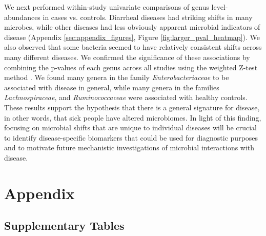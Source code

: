 \documentclass[12pt]{article}
\begin{document}
We next performed within-study univariate comparisons of genus level-abundances in cases vs. controls. Diarrheal 
diseases had striking shifts in many microbes, while other
diseases had less obviously apparent microbial indicators of disease (Appendix \ref{sec:appendix_figures}, Figure \ref{fig:larger_pval_heatmap}). We also observed that some bacteria
seemed to have relatively consistent shifts across many
different diseases. We confirmed the significance of these associations by combining the p-values of each genus across all studies using the weighted Z-test method \cite{zavkin-ztest-2011}.
We found many genera in the family \textit{Enterobacteriaceae} to be associated
with disease in general, while many genera in the families \textit{Lachnospiraceae}, 
and \textit{Ruminococcaceae} were associated with healthy controls.
These results support the hypothesis that
there is a general signature for disease, in other words, that sick people have 
altered microbiomes. In light of this finding, focusing on microbial shifts that 
are unique to individual diseases will be crucial to identify disease-specific biomarkers
that could be used for diagnostic purposes and to motivate future mechanistic investigations of microbial interactions with disease.


\newpage
\section{Appendix}
\subsection{Supplementary Tables}\label{sec:appendix_tables}
\end{document}
